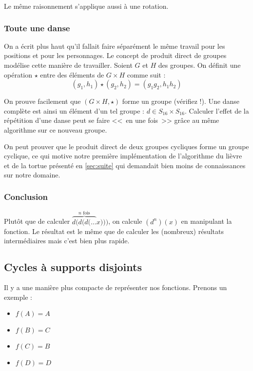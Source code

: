 \documentclass[11pt,a4paper,oneside]{book}
\begin{document}
Le même raisonnement s'applique aussi à une rotation.

\subsubsection{Toute une danse}
On a écrit plus haut qu'il fallait faire séparément le même travail pour les
positions et pour les personnages. Le concept de produit direct de groupes
modélise cette manière de travailler. Soient $G$ et $H$ des groupes. On définit
une opération $\star$ entre des éléments de $G\times H$ comme suit : \[
	(g_1, h_1) \star (g_2, h_2) = (g_1g_2, h_1h_2)
\]

On prouve facilement que $(G\times H, \star)$ forme un groupe (vérifiez !).
Une danse complète est ainsi un élément d'un tel groupe :
$d\in S_{16}\times S_{16}$.
Calculer l'effet de la répétition d'une danse peut se faire <<~en une fois~>>
grâce au même algorithme sur ce nouveau groupe.

On peut prouver que le produit direct de deux groupes cycliques forme un groupe
cyclique, ce qui motive notre première implémentation de l'algorithme du lièvre
et de la tortue présenté en \ref{sec:suite}
qui demandait bien moins de connaissances sur notre domaine.


\subsubsection{Conclusion}
Plutôt que de calculer $\overbrace{d(d(d(\dots}^\text{$n$ fois} x)))$,
on calcule $\left(d^n\right)(x)$ en manipulant la fonction. Le résultat est le
même que de calculer les (nombreux) résultats intermédiaires mais c'est bien
plus rapide.

\subsection{Cycles à supports disjoints}
Il y a une manière plus compacte de représenter nos fonctions.
Prenons un exemple :
\begin{itemize}
\item $f(A)=A$
\item $f(B)=C$
\item $f(C)=B$
\item $f(D)=D$
\end{itemize}
\end{document}
